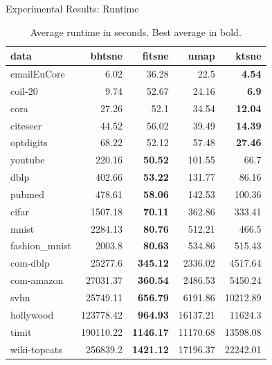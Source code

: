 \documentclass{beamer}
\begin{document}
\begin{frame}[fragile]{Experimental Results: Runtime}
\fontsize{8pt}{7.9}\selectfont
\begin{table}[tb]
  \centering
  \begin{tabular}{lrrrr}
    \toprule
data & bhtsne & fitsne & umap & ktsne \\ \midrule
emailEuCore & 6.02 & 36.28 & 22.5 & \bfseries 4.54 \\
coil-20 & 9.74 & 52.67 & 24.16 & \bfseries 6.9 \\
cora & 27.26 & 52.1 & 34.54 & \bfseries 12.04 \\
citeseer & 44.52 & 56.02 & 39.49 & \bfseries 14.39 \\
optdigits & 68.22 & 52.12 & 57.48 & \bfseries 27.46 \\
youtube & 220.16 & \bfseries 50.52 & 101.55 & 66.7 \\
dblp & 402.66 & \bfseries 53.22 & 131.77 & 86.16 \\
pubmed & 478.61 & \bfseries 58.06 & 142.53 & 100.36 \\
cifar & 1507.18 & \bfseries 70.11 & 362.86 & 333.41 \\
mnist & 2284.13 & \bfseries 80.76 & 512.21 & 466.5 \\
fashion\_mnist & 2003.8 & \bfseries 80.63 & 534.86 & 515.43 \\
com-dblp & 25277.6 & \bfseries 345.12 & 2336.02 & 4517.64 \\
com-amazon & 27031.37 & \bfseries 360.54 & 2486.53 & 5450.24 \\
svhn & 25749.11 & \bfseries 656.79 & 6191.86 & 10212.89 \\
hollywood & 123778.42 & \bfseries 964.93 & 16137.21 & 11624.3 \\
timit & 190110.22 & \bfseries 1146.17 & 11170.68 & 13598.08 \\
wiki-topcats & 256839.2 & \bfseries 1421.12 & 17196.37 & 22242.01 \\
\bottomrule
  \end{tabular}
  \caption{Average runtime in seconds. Best average in bold.}
\label{tab:comp}
\end{table}
\end{frame}
\end{document}
